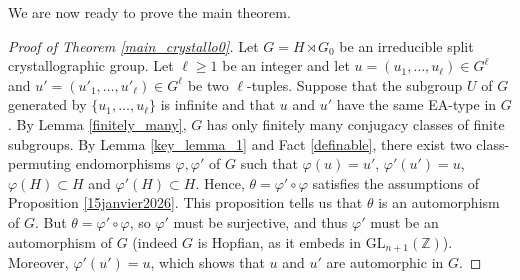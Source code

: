 \documentclass[a4paper, 11pt]{amsart}
\theoremstyle{definition}
\theoremstyle{remark}
\renewcommand{\geq}{\geqslant}
\begin{document}
We are now ready to prove the main theorem.

\begin{proof}[Proof of Theorem \ref{main_crystallo0}]
Let $G=H\rtimes G_0$ be an irreducible split crystallographic group. Let $\ell\geq 1$ be an integer and let $u=(u_1,\ldots,u_{\ell})\in G^{\ell}$ and $u'=(u'_1,\ldots,u'_{\ell})\in G^{\ell}$ be two $\ell$-tuples. Suppose that the subgroup $U$ of $G$ generated by $\lbrace u_1,\ldots,u_{\ell}\rbrace$ is infinite and that $u$ and $u'$ have the same EA-type in $G$. By Lemma \ref{finitely_many}, $G$ has only finitely many conjugacy classes of finite subgroups. By Lemma \ref{key_lemma_1} and Fact \ref{definable}, there exist two class-permuting endomorphisms $\varphi,\varphi'$ of $G$ such that $\varphi(u)=u'$, $\varphi'(u')=u$, $\varphi(H)\subset H$ and $\varphi'(H)\subset H$. Hence, $\theta=\varphi'\circ\varphi$ satisfies the assumptions of Proposition \ref{15janvier2026}. This proposition tells us that $\theta$ is an automorphism of $G$. But $\theta=\varphi'\circ \varphi$, so $\varphi'$ must be surjective, and thus $\varphi'$ must be an automorphism of $G$ (indeed $G$ is Hopfian, as it embeds in $\mathrm{GL}_{n+1}(\mathbb{Z})$). Moreover, $\varphi'(u')=u$, which shows that $u$ and $u'$ are automorphic in $G$.\end{proof}



\end{document}
